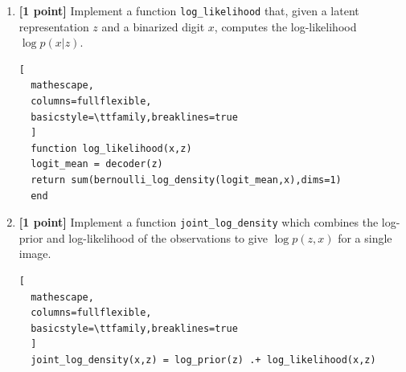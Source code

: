 \documentclass{article}
\begin{document}
\begin{enumerate}[label=(\alph*)]
\begin{lstlisting}[
  mathescape,
  columns=fullflexible,
  basicstyle=\ttfamily,breaklines=true
  ]
  decoder = Chain(Dense(Dz, Dh, tanh), Dense(Dh, Ddata))
\end{lstlisting}

	
	\item {\bf [1 point]} Implement a function \texttt{log\_likelihood} that, given a latent representation $z$ and a binarized digit $x$, computes the log-likelihood $\log p(x|z)$.
\begin{lstlisting}[
  mathescape,
  columns=fullflexible,
  basicstyle=\ttfamily,breaklines=true
  ]
  function log_likelihood(x,z)
  logit_mean = decoder(z)
  return sum(bernoulli_log_density(logit_mean,x),dims=1)
  end
\end{lstlisting}
        
   \item {\bf [1 point]} Implement a function \texttt{joint\_log\_density} which combines the log-prior and log-likelihood of the observations to give $\log p(z, x)$ for a single image.

\begin{lstlisting}[
  mathescape,
  columns=fullflexible,
  basicstyle=\ttfamily,breaklines=true
  ]
  joint_log_density(x,z) = log_prior(z) .+ log_likelihood(x,z)
\end{lstlisting}

\end{enumerate}

\pagebreak
\end{document}
